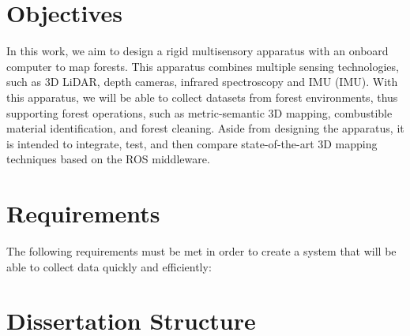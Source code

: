 \section{Objectives}
In this work, we aim to design a rigid multisensory apparatus with an onboard computer to map forests. This apparatus combines multiple sensing technologies, such as 3D \acs{LiDAR}, depth cameras, infrared spectroscopy and \acl{IMU} (\acs{IMU}). With this apparatus, we will be able to collect datasets from forest environments, thus supporting forest operations, such as metric-semantic 3D mapping, combustible material identification, and forest cleaning. Aside from designing the apparatus, it is intended to integrate, test, and then compare state-of-the-art 3D mapping techniques based on the ROS middleware.

\section{Requirements}
The following requirements must be met in order to create a system that will be able to collect data quickly and efficiently:



\section{Dissertation Structure}